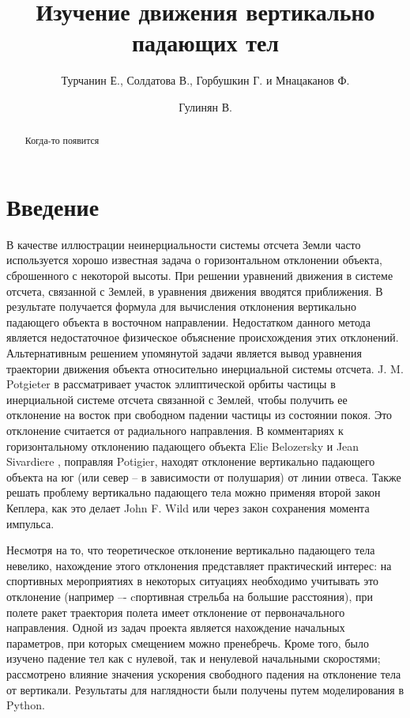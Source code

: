 \documentclass[hoptionsi, twocolumn]{revtex4-2}
\begin{document}
\title{Изучение движения вертикально падающих тел}
\author{Турчанин Е., Солдатова В., Горбушкин Г. и Мнацаканов Ф.}
\author{Гулинян В.}
\begin{abstract}
 Когда-то появится
\end{abstract}
\maketitle
\onehalfspacing
\twocolumngrid
\section{Введение}
В качестве иллюстрации неинерциальности системы отсчета Земли часто используется хорошо известная задача о горизонтальном отклонении объекта, сброшенного с некоторой высоты. При решении уравнений движения в системе отсчета, связанной с Землей, в уравнения движения вводятся приближения. В результате получается формула для вычисления отклонения вертикально падающего объекта в восточном направлении. Недостатком данного метода является недостаточное физическое объяснение происхождения этих отклонений. Альтернативным решением упомянутой задачи является вывод уравнения траектории движения объекта относительно инерциальной системы отсчета. J. M. Potgieter в  \cite{1} рассматривает участок эллиптической орбиты частицы в инерциальной системе отсчета связанной с Землей, чтобы получить ее отклонение на восток при свободном падении частицы из состоянии покоя. Это отклонение считается от радиального направления. В комментариях к горизонтальному отклонению падающего объекта Elie Belozersky и Jean Sivardiere \cite{3}, поправляя Potigier, находят отклонение вертикально падающего объекта на юг (или север – в зависимости от полушария) от линии отвеса. Также решать проблему вертикально падающего тела можно применяя второй закон Кеплера, как это делает John F. Wild \cite{9} или через закон сохранения момента импульса\cite{6}.

Несмотря на то, что теоретическое отклонение вертикально падающего тела невелико, нахождение этого отклонения представляет практический интерес: на спортивных мероприятиях в некоторых ситуациях необходимо учитывать это отклонение (например –- cпортивная стрельба на большие расстояния), при полете ракет траектория полета имеет отклонение от первоначального направления. Одной из задач проекта является нахождение начальных параметров, при которых смещением можно пренебречь. Кроме того, было изучено падение тел как с нулевой, так и ненулевой начальными скоростями; рассмотрено влияние значения ускорения свободного падения на отклонение тела от вертикали. Результаты для наглядности были получены путем моделирования в Python. 
\end{document}
